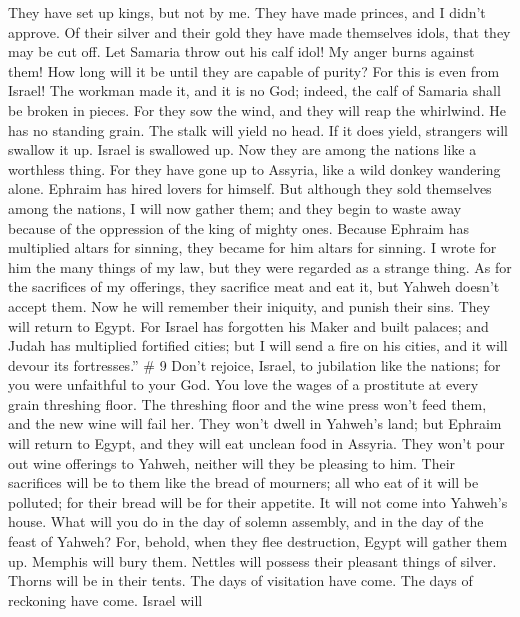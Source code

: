 They have set up kings, but not by me. They have made princes, and I
didn't approve. Of their silver and their gold they have made themselves
idols, that they may be cut off.  Let Samaria throw out his
calf idol! My anger burns against them! How long will it be until they
are capable of purity?  For this is even from Israel! The
workman made it, and it is no God; indeed, the calf of Samaria shall be
broken in pieces.  For they sow the wind, and they will reap
the whirlwind. He has no standing grain. The stalk will yield no head.
If it does yield, strangers will swallow it up.  Israel is
swallowed up. Now they are among the nations like a worthless thing.
 For they have gone up to Assyria, like a wild donkey
wandering alone. Ephraim has hired lovers for himself.  But
although they sold themselves among the nations, I will now gather them;
and they begin to waste away because of the oppression of the king of
mighty ones.  Because Ephraim has multiplied altars for
sinning, they became for him altars for sinning.  I wrote
for him the many things of my law, but they were regarded as a strange
thing.  As for the sacrifices of my offerings, they
sacrifice meat and eat it, but Yahweh doesn't accept them. Now he will
remember their iniquity, and punish their sins. They will return to
Egypt.  For Israel has forgotten his Maker and built
palaces; and Judah has multiplied fortified cities; but I will send a
fire on his cities, and it will devour its fortresses.'' \# 9
 Don't rejoice, Israel, to jubilation like the nations; for
you were unfaithful to your God. You love the wages of a prostitute at
every grain threshing floor.  The threshing floor and the
wine press won't feed them, and the new wine will fail her. 
They won't dwell in Yahweh's land; but Ephraim will return to Egypt, and
they will eat unclean food in Assyria.  They won't pour out
wine offerings to Yahweh, neither will they be pleasing to him. Their
sacrifices will be to them like the bread of mourners; all who eat of it
will be polluted; for their bread will be for their appetite. It will
not come into Yahweh's house.  What will you do in the day
of solemn assembly, and in the day of the feast of Yahweh? 
For, behold, when they flee destruction, Egypt will gather them up.
Memphis will bury them. Nettles will possess their pleasant things of
silver. Thorns will be in their tents.  The days of
visitation have come. The days of reckoning have come. Israel will
